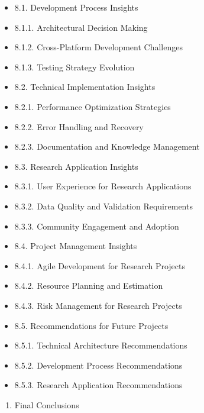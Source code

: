 \documentclass[11pt,a4paper]{report}
\begin{document}
\begin{itemize}
\item 8.1. Development Process Insights
\item 8.1.1. Architectural Decision Making
\item 8.1.2. Cross-Platform Development Challenges
\item 8.1.3. Testing Strategy Evolution
\item 8.2. Technical Implementation Insights
\item 8.2.1. Performance Optimization Strategies
\item 8.2.2. Error Handling and Recovery
\item 8.2.3. Documentation and Knowledge Management
\item 8.3. Research Application Insights
\item 8.3.1. User Experience for Research Applications
\item 8.3.2. Data Quality and Validation Requirements
\item 8.3.3. Community Engagement and Adoption
\item 8.4. Project Management Insights
\item 8.4.1. Agile Development for Research Projects
\item 8.4.2. Resource Planning and Estimation
\item 8.4.3. Risk Management for Research Projects
\item 8.5. Recommendations for Future Projects
\item 8.5.1. Technical Architecture Recommendations
\item 8.5.2. Development Process Recommendations
\item 8.5.3. Research Application Recommendations
\end{itemize}
\begin{enumerate}
\item Final Conclusions
\end{enumerate}
\end{document}
